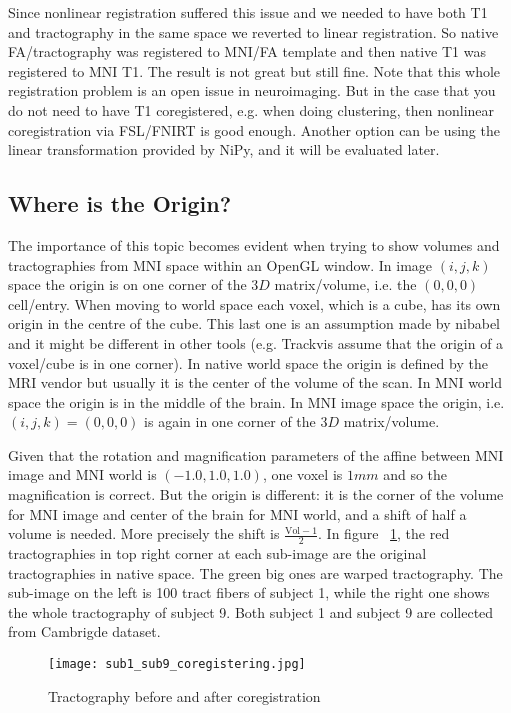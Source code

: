 Since nonlinear registration suffered this issue and we needed to have both T1 and tractography in the same space we reverted to linear
registration. So native FA/tractography was registered to MNI/FA template and then native T1 was registered to MNI T1. The result is
not great but still fine. Note that this whole registration problem is an open issue in neuroimaging. But in the case that you do not need to have T1 coregistered, e.g. when doing clustering, then nonlinear coregistration via FSL/FNIRT is good enough. Another option can be using the linear transformation provided by NiPy, and it will be evaluated later.

\subsection{Where is the Origin?}
The importance of this topic becomes evident when trying to show volumes and tractographies from MNI space within an OpenGL window.
In image $(i,j,k)$ space the origin is on one corner of the $3D$ matrix/volume, i.e. the $(0,0,0)$ cell/entry. When moving to world space each voxel, which is a cube, has its own origin in the centre of the cube. This last one is an assumption made by nibabel and it might be different in other tools (e.g. Trackvis assume that the origin of a voxel/cube is in one corner). In native world space the origin is defined by the MRI vendor but usually it is the center of the volume of the scan. In MNI world space the origin is in the middle of the brain. In MNI image space the origin, i.e. $(i,j,k)=(0,0,0)$ is again in one corner of the $3D$ matrix/volume.

 Given that the rotation and magnification parameters of the affine between MNI image and MNI world is $(-1.0, 1.0, 1.0)$, one voxel is $1mm$ and so the magnification is correct. But the origin is different: it is the corner of the volume for MNI image and center of the brain for MNI world, and a shift of half a volume is needed. More precisely the shift is $\frac{\mathrm{Vol}-1}{2}$. In figure ~\ref{Fig:sub1sub9coregister}, the red tractographies in top right corner at each sub-image are the original tractographies in native space. The green big ones are warped tractography. The sub-image on the left is 100 tract fibers of subject 1, while the right one shows the whole tractography of subject 9. Both subject 1 and subject 9 are collected from Cambrigde dataset.

\begin{figure}
  \centering
  \texttt{[image: sub1\_sub9\_coregistering.jpg]}
  \caption{Tractography before and after coregistration}
  \label{Fig:sub1sub9coregister}
\end{figure}



